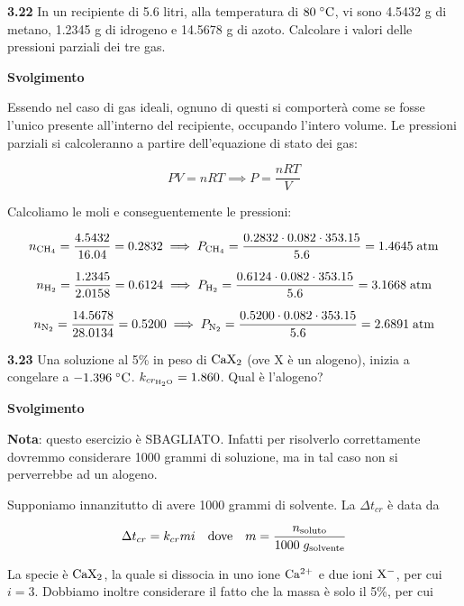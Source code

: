 \vspace{0.2cm}\textbf{3.22} In un recipiente di 5.6 litri, alla temperatura di $80 \; ^{\circ} \rm C$, vi sono 4.5432 g di metano, 1.2345 g di idrogeno e 14.5678 g di azoto. Calcolare i valori delle pressioni parziali dei tre gas. 

\vspace{0.2cm}\large\textbf{Svolgimento}\normalsize

\vspace{0.2cm}Essendo nel caso di gas ideali, ognuno di questi si comporterà come se fosse l'unico presente all'interno del recipiente, occupando l'intero volume. Le pressioni parziali si calcoleranno a partire dell'equazione di stato dei gas:

$$PV=nRT
\implies
P=\frac{nRT}{V}$$

Calcoliamo le moli e conseguentemente le pressioni:

$$n_{\rm CH_4}=\frac{4.5432}{16.04}=0.2832
\implies
P_{\rm CH_4}=\frac{0.2832 \cdot 0.082 \cdot 353.15}{5.6}=1.4645 \; \rm atm$$

$$n_{\rm H_2}=\frac{1.2345}{2.0158}=0.6124
\implies
P_{\rm H_2}=\frac{0.6124 \cdot 0.082 \cdot 353.15}{5.6}=3.1668 \; \rm atm$$

$$n_{\rm N_2}=\frac{14.5678}{28.0134}=0.5200
\implies
P_{\rm N_2}=\frac{0.5200 \cdot 0.082 \cdot 353.15}{5.6}=2.6891 \; \rm atm$$

\vspace{0.2cm}\textbf{3.23} Una soluzione al 5\% in peso di $\rm CaX_2$ (ove X è un alogeno), inizia a congelare a $-1.396 \; \rm ^{\circ}C$. $k_{cr_{\rm H_2O}} = 1.860$. Qual è l'alogeno? 

\vspace{0.2cm}\large\textbf{Svolgimento}\normalsize

\vspace{0.2cm}\textbf{Nota}: questo esercizio è SBAGLIATO. Infatti per risolverlo correttamente dovremmo considerare 1000 grammi di soluzione, ma in tal caso non si perverrebbe ad un alogeno.

\vspace{0.2cm}Supponiamo innanzitutto di avere 1000 grammi di solvente. La $\Delta t_{cr}$ è data da

$$\Delta t_{cr}=k_{cr} m i
\quad\text{dove}\quad
m=\frac{n_{\rm soluto}}{1000\;g_{\rm solvente}}$$

La specie è $\rm CaX_2$, la quale si dissocia in uno ione $\rm Ca^{2+}$ e due ioni $\rm X^-$, per cui $i=3$. Dobbiamo inoltre considerare il fatto che la massa è solo il 5\%, per cui

